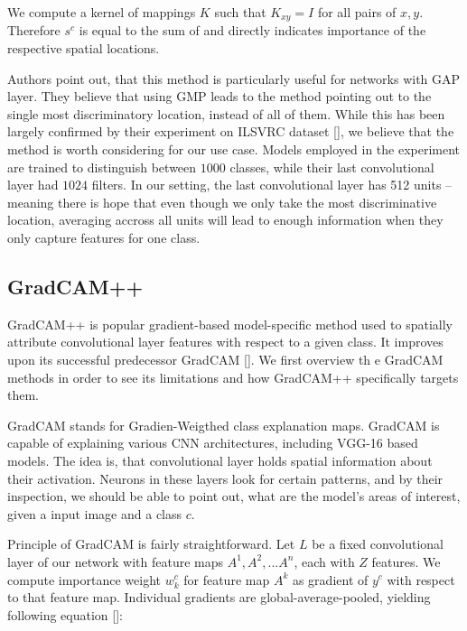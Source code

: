 We compute a kernel of mappings $K$ such that $K_{xy} = I$ for all pairs of $x, y$. Therefore $s^c$ is equal to the sum of  and directly indicates importance of the respective spatial locations.\newline

\noindent
Authors point out, that this method is particularly useful for networks with GAP layer. They believe that using GMP leads to the method pointing out to the single most discriminatory location, instead of all of them. While this has been largely confirmed by their experiment on ILSVRC dataset [], we believe that the method is worth considering for our use case. Models employed in the experiment are trained to distinguish between $1000$ classes, while their last convolutional layer had $1024$ filters. In our setting, the last convolutional layer has 512 units -- meaning there is hope that even though we only take the most discriminative location, averaging accross all units will lead to enough information when they only capture features for one class.




\subsection{GradCAM++}

GradCAM++ is popular gradient-based model-specific method used to spatially attribute convolutional layer features with respect to a given class. It improves upon its successful predecessor GradCAM []. We first overview th e GradCAM methods in order to see its limitations and how GradCAM++ specifically targets them.


GradCAM stands for Gradien-Weigthed class explanation maps. GradCAM is capable of explaining various CNN architectures, including VGG-16 based models. The idea is, that convolutional layer holds spatial information about their activation. Neurons in these layers look for certain patterns, and by their inspection, we should be able to point out, what are the model's areas of interest, given a input image and a class $c$.

Principle of GradCAM is fairly straightforward. Let $L$ be a fixed convolutional layer of our network with feature maps $A^1, A^2, ... A^n$, each with $Z$ features. We compute importance weight $w^c_k$ for feature map $A^k$ as gradient of $y^c$ with respect to that feature map. Individual gradients are global-average-pooled, yielding following equation []:

